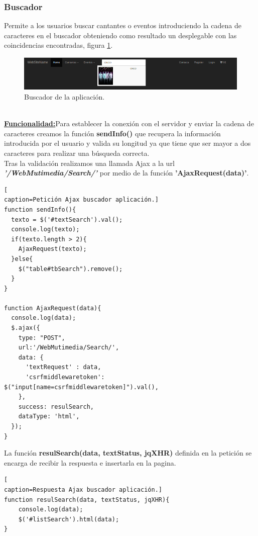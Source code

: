 \subsubsection*{Buscador}
Permite a los usuarios buscar cantantes o eventos introduciendo la cadena de caracteres en el buscador obteniendo como resultado un desplegable con las coincidencias encontradas, figura \ref{fig:Search_Bar}.
\begin{figure}[!h]
\begin{center}
   \includegraphics[width=0.7\linewidth]{Figures/Bar_Navegacion}
	\decoRule
	\caption[Buscador de la aplicación]{Buscador de la aplicación.}
\label{fig:Search_Bar}
\end{center}
\end{figure}
\\\underline{\textbf{Funcionalidad:}}Para establecer la conexión con el servidor y enviar la cadena de caracteres creamos la función \textbf{sendInfo()} que recupera la información introducida por el usuario y valida su longitud ya que tiene que ser mayor a dos caracteres para realizar una búsqueda correcta.
\\Tras la validación realizamos una llamada Ajax a la url \textit{\textbf{'/WebMutimedia/Search/'}} por medio de la función \textbf{'AjaxRequest(data)'}.
\begin{lstlisting}[
caption=Petición Ajax buscador aplicación.]
function sendInfo(){
  texto = $('#textSearch').val();
  console.log(texto);
  if(texto.length > 2){
    AjaxRequest(texto);
  }else{
    $("table#tbSearch").remove();
  }
}

function AjaxRequest(data){
  console.log(data);
  $.ajax({ 
    type: "POST",
    url:'/WebMutimedia/Search/',
    data: {
      'textRequest' : data,
      'csrfmiddlewaretoken': $("input[name=csrfmiddlewaretoken]").val(),
    },
    success: resulSearch,
    dataType: 'html',
  });
}
\end{lstlisting}
La función \textbf{resulSearch(data, textStatus, jqXHR)} definida en la petición se encarga de recibir la respuesta e insertarla en la pagina.
\begin{lstlisting}[
caption=Respuesta Ajax buscador aplicación.]
function resulSearch(data, textStatus, jqXHR){
    console.log(data);
    $('#listSearch').html(data);
}
\end{lstlisting}
